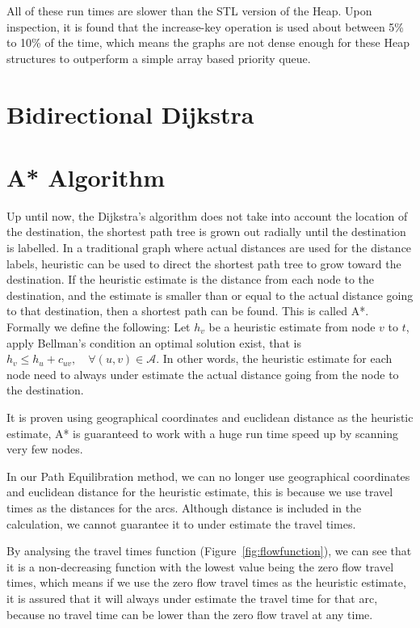 All of these run times are slower than the STL version of the Heap.
Upon inspection,
it is found that the increase-key operation is used about between 5\% to 10\%
of the time,
which means the graphs are not dense enough for these Heap structures to outperform a
simple array based priority queue.

\section{Bidirectional Dijkstra}
\section{A* Algorithm}
Up until now,
the Dijkstra's algorithm does not take into account the location of the destination,
the shortest path tree is grown out radially until the destination is labelled.
In a traditional graph where actual distances are used for the distance labels,
heuristic can be used to direct the shortest path tree to grow toward the destination.
If the heuristic estimate is the distance from each node to the destination,
and the estimate is smaller than or equal to the actual distance going to that destination,
then a shortest path can be found. This is called A*.
Formally we define the following: Let $h_v$ be a heuristic estimate from node $v$ to $t$,
apply Bellman's condition an optimal solution exist, that is 
$ h_v \leq h_u + c_{uv}, \quad \forall(u,v) \in \mathcal{A} $.
In other words, the heuristic estimate for each node need to always under estimate the actual distance
going from the node to the destination.

It is proven using geographical coordinates and euclidean distance as the heuristic estimate,
A* is guaranteed to work with a huge run time speed up by scanning very few nodes.

In our Path Equilibration method,
we can no longer use geographical coordinates and euclidean distance for the heuristic estimate,
this is because we use travel times as the distances for the arcs.
Although distance is included in the calculation,
we cannot guarantee it to under estimate the travel times.

By analysing the travel times function (Figure~\ref{fig:flowfunction}),
we can see that it is a non-decreasing function with the lowest value being the zero flow travel times,
which means if we use the zero flow travel times as the heuristic estimate,
it is assured that it will always under estimate the travel time for that arc,
because no travel time can be lower than the zero flow travel at any time.

